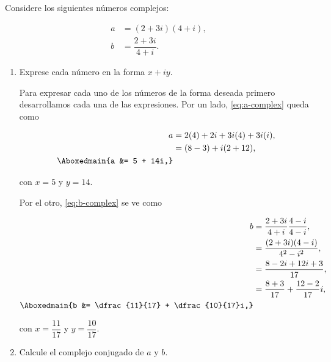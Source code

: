 \documentclass[./../main.tex]{subfiles}
\begin{document}
    \section{}

    Considere los siguientes números complejos:

    \begin{align}
        a &= (2 + 3i)(4 + i),\label{eq:a-complex}\\
        b &= \dfrac{2 + 3i}{4 + i}.\label{eq:b-complex}
    \end{align}

    \begin{enumerate}
        \item Exprese cada número en la forma \(x + iy\).
        
        \startsolution

        Para expresar cada uno de los números de la forma deseada primero desarrollamos cada una de las expresiones. Por un lado, \cref{eq:a-complex} queda como

        \begin{align}
            a &= 2(4) + 2i + 3i(4) + 3i(i),\nonumber\\
            &= (8 - 3) + i(2 + 12),\nonumber\\
            \Aboxedmain{a &= 5 + 14i,}\label{eq:a-complex-result}
        \end{align}

        con \(x = 5\) y \(y = 14\).

        \pagebreak
        Por el otro, \cref{eq:b-complex} se ve como

        \begin{align}
            b &= \dfrac{2 + 3i}{4 + i}\dfrac{4 - i}{4 - i},\nonumber\\
            &= \dfrac{(2 + 3i)(4 - i)}{4^{2} - i^{2}},\nonumber\\
            &= \dfrac{8 - 2i + 12i + 3}{17},\nonumber\\
            &= \dfrac{8 + 3}{17} + \dfrac{12 - 2}{17}i,\nonumber\\
            \Aboxedmain{b &= \dfrac{11}{17} + \dfrac{10}{17}i,}\label{eq:b-complex-result}
        \end{align}

        con \(x = \dfrac{11}{17}\) y \(y = \dfrac{10}{17}\).
        
        \item Calcule el complejo conjugado de \(a\) y \(b\).
        

\end{enumerate}
\end{document}
